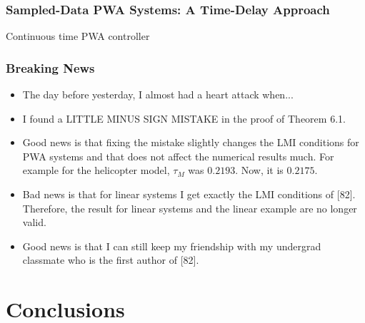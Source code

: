 \documentclass{beamer}
\newcommand{\red}{\color[rgb]{1,0,0}}
\newcommand{\green}{\color[rgb]{0,0.79,0}}
\begin{document}
\frame
  {  
  \frametitle{Sampled-Data PWA Systems: A Time-Delay Approach}
\centerline{}
\centerline{Continuous time PWA controller}    
}

\frame
{
  \frametitle{Breaking News}
\begin{itemize}
\item<1-> The day before yesterday, I almost had a heart attack when...
\item<2-> I found a {\Large {\red LITTLE MINUS SIGN MISTAKE}} in the proof of Theorem 6.1.
\item<3-> {\green Good news} is that fixing the mistake slightly changes the LMI conditions for PWA systems and that does not affect the numerical results much. For example for the helicopter model, $\tau_M$ was $0.2193$. Now, it is $0.2175$.
\item<4-> {\red Bad news} is that for linear systems I get exactly the LMI conditions of [82]. Therefore, the result for linear systems and the linear example are no longer valid.
\item<5-> {\green Good news} is that I can still keep my friendship with my undergrad classmate who is the first author of [82]. 
\end{itemize}
}

\section{Conclusions}
\end{document}
